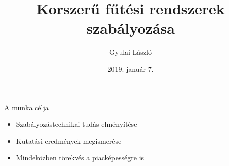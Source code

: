 \documentclass[14pt,handout]{beamer}
\title{Korszerű fűtési rendszerek szabályozása}
\author{Gyulai László}
\date{2019. január 7.}
\begin{document}
	
	\frame{\titlepage}
%
%        	        	
%

\begin{frame}{A munka célja}
\begin{itemize}
	\setlength{\itemsep}{6pt}
	\item Szabályozástechnikai tudás elményítése
	\item Kutatási eredmények megismerése
	\item Mindeközben törekvés a piacképességre is	
\end{itemize}
\end{frame}
\end{document}
